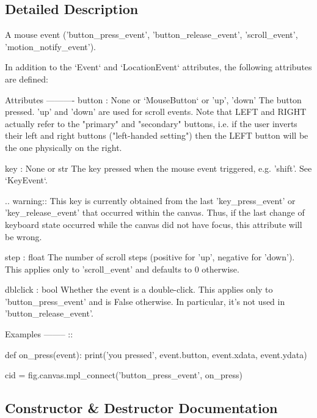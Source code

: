 \subsection{Detailed Description}
\begin{DoxyVerb}A mouse event ('button_press_event',
               'button_release_event',
               'scroll_event',
               'motion_notify_event').

In addition to the `Event` and `LocationEvent`
attributes, the following attributes are defined:

Attributes
----------
button : None or `MouseButton` or {'up', 'down'}
    The button pressed. 'up' and 'down' are used for scroll events.
    Note that LEFT and RIGHT actually refer to the "primary" and
    "secondary" buttons, i.e. if the user inverts their left and right
    buttons ("left-handed setting") then the LEFT button will be the one
    physically on the right.

key : None or str
    The key pressed when the mouse event triggered, e.g. 'shift'.
    See `KeyEvent`.

    .. warning::
       This key is currently obtained from the last 'key_press_event' or
       'key_release_event' that occurred within the canvas.  Thus, if the
       last change of keyboard state occurred while the canvas did not have
       focus, this attribute will be wrong.

step : float
    The number of scroll steps (positive for 'up', negative for 'down').
    This applies only to 'scroll_event' and defaults to 0 otherwise.

dblclick : bool
    Whether the event is a double-click. This applies only to
    'button_press_event' and is False otherwise. In particular, it's
    not used in 'button_release_event'.

Examples
--------
::

    def on_press(event):
        print('you pressed', event.button, event.xdata, event.ydata)

    cid = fig.canvas.mpl_connect('button_press_event', on_press)
\end{DoxyVerb}
 

\subsection{Constructor \& Destructor Documentation}
\mbox{\label{classmatplotlib_1_1backend__bases_1_1MouseEvent_a50d4773771416d12a692e5c5086fdc97}} 
